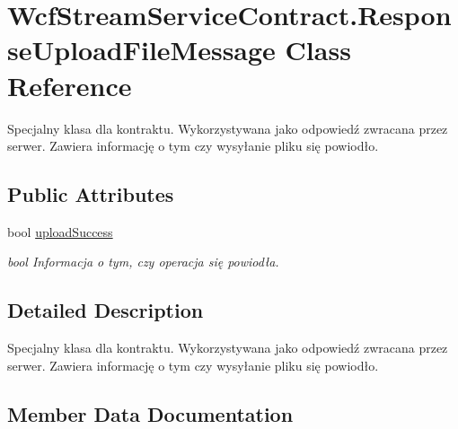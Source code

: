 \hypertarget{class_wcf_stream_service_contract_1_1_response_upload_file_message}{}\section{Wcf\+Stream\+Service\+Contract.\+Response\+Upload\+File\+Message Class Reference}
\label{class_wcf_stream_service_contract_1_1_response_upload_file_message}


Specjalny klasa dla kontraktu. Wykorzystywana jako odpowiedź zwracana przez serwer. Zawiera informację o tym czy wysyłanie pliku się powiodło.  


\subsection*{Public Attributes}
\begin{DoxyCompactItemize}
\item 
bool \hyperlink{class_wcf_stream_service_contract_1_1_response_upload_file_message_aff5c13a7d74b9b3848289218762f04d6}{upload\+Success}
\begin{DoxyCompactList}\small\item\em bool Informacja o tym, czy operacja się powiodła. \end{DoxyCompactList}\end{DoxyCompactItemize}


\subsection{Detailed Description}
Specjalny klasa dla kontraktu. Wykorzystywana jako odpowiedź zwracana przez serwer. Zawiera informację o tym czy wysyłanie pliku się powiodło. 



\subsection{Member Data Documentation}
\mbox{\label{class_wcf_stream_service_contract_1_1_response_upload_file_message_aff5c13a7d74b9b3848289218762f04d6}} 
